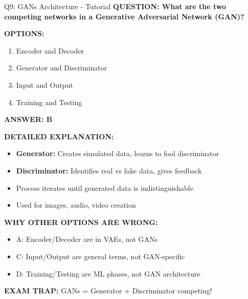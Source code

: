\documentclass[8pt]{beamer}
\begin{document}
	\begin{frame}{Q9: GANs Architecture - Tutorial}
		\fontsize{6.5}{7.5}\selectfont
		\textbf{QUESTION: What are the two competing networks in a Generative Adversarial Network (GAN)?}
		
		\vspace{0.1cm}
		\textbf{OPTIONS:}
		\begin{enumerate}
			\item Encoder and Decoder
			\item Generator and Discriminator
			\item Input and Output
			\item Training and Testing
		\end{enumerate}
		
		\vspace{0.1cm}
		\textcolor{myblue}{\textbf{ANSWER: B}}
		
		\vspace{0.1cm}
		\textbf{DETAILED EXPLANATION:}
		\begin{itemize}
			\item \textbf{Generator:} Creates simulated data, learns to fool discriminator
			\item \textbf{Discriminator:} Identifies real vs fake data, gives feedback
			\item Process iterates until generated data is indistinguishable
			\item Used for images, audio, video creation
		\end{itemize}
		
		\vspace{0.1cm}
		\textcolor{myred}{\textbf{WHY OTHER OPTIONS ARE WRONG:}}
		\begin{itemize}
			\item \textcolor{myred}{A:} Encoder/Decoder are in VAEs, not GANs
			\item \textcolor{myred}{C:} Input/Output are general terms, not GAN-specific
			\item \textcolor{myred}{D:} Training/Testing are ML phases, not GAN architecture
		\end{itemize}
		
		\textcolor{myred}{\textbf{EXAM TRAP:}} GANs = \textcolor{myblue}{Generator + Discriminator} competing!
	\end{frame}
	
\end{document}
